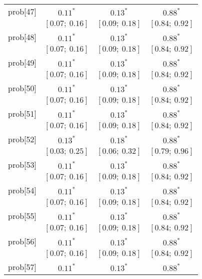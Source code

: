 \begin{table}
\begin{center}
\begin{tabular}{l c c c }
prob[47]  & $0.11^{*}$              & $0.13^{*}$              & $0.88^{*}$            \\
          & $[0.07;\ 0.16]$         & $[0.09;\ 0.18]$         & $[0.84;\ 0.92]$       \\
prob[48]  & $0.11^{*}$              & $0.13^{*}$              & $0.88^{*}$            \\
          & $[0.07;\ 0.16]$         & $[0.09;\ 0.18]$         & $[0.84;\ 0.92]$       \\
prob[49]  & $0.11^{*}$              & $0.13^{*}$              & $0.88^{*}$            \\
          & $[0.07;\ 0.16]$         & $[0.09;\ 0.18]$         & $[0.84;\ 0.92]$       \\
prob[50]  & $0.11^{*}$              & $0.13^{*}$              & $0.88^{*}$            \\
          & $[0.07;\ 0.16]$         & $[0.09;\ 0.18]$         & $[0.84;\ 0.92]$       \\
prob[51]  & $0.11^{*}$              & $0.13^{*}$              & $0.88^{*}$            \\
          & $[0.07;\ 0.16]$         & $[0.09;\ 0.18]$         & $[0.84;\ 0.92]$       \\
prob[52]  & $0.13^{*}$              & $0.18^{*}$              & $0.88^{*}$            \\
          & $[0.03;\ 0.25]$         & $[0.06;\ 0.32]$         & $[0.79;\ 0.96]$       \\
prob[53]  & $0.11^{*}$              & $0.13^{*}$              & $0.88^{*}$            \\
          & $[0.07;\ 0.16]$         & $[0.09;\ 0.18]$         & $[0.84;\ 0.92]$       \\
prob[54]  & $0.11^{*}$              & $0.13^{*}$              & $0.88^{*}$            \\
          & $[0.07;\ 0.16]$         & $[0.09;\ 0.18]$         & $[0.84;\ 0.92]$       \\
prob[55]  & $0.11^{*}$              & $0.13^{*}$              & $0.88^{*}$            \\
          & $[0.07;\ 0.16]$         & $[0.09;\ 0.18]$         & $[0.84;\ 0.92]$       \\
prob[56]  & $0.11^{*}$              & $0.13^{*}$              & $0.88^{*}$            \\
          & $[0.07;\ 0.16]$         & $[0.09;\ 0.18]$         & $[0.84;\ 0.92]$       \\
prob[57]  & $0.11^{*}$              & $0.13^{*}$              & $0.88^{*}$            \\

\end{tabular}
\end{center}
\end{table}
